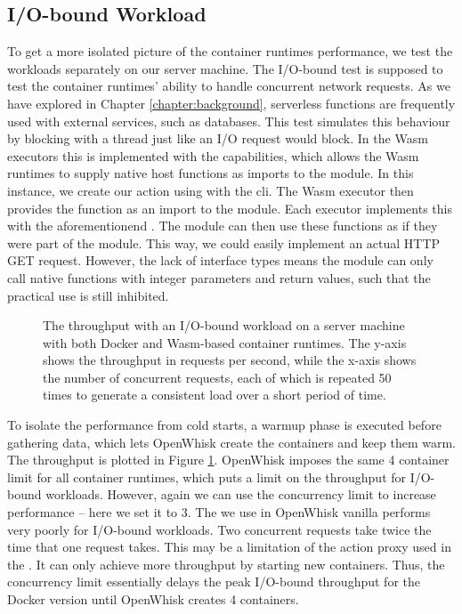 \subsection{I/O-bound Workload}

To get a more isolated picture of the container runtimes performance, we test the workloads separately on our server machine. The I/O-bound test is supposed to test the container runtimes' ability to handle concurrent network requests. As we have explored in Chapter \ref{chapter:background}, serverless functions are frequently used with external services, such as databases. This test simulates this behaviour by blocking with a thread  just like an I/O request would block. In the Wasm executors this is implemented with the capabilities, which allows the Wasm runtimes to supply native host functions as imports to the module. In this instance, we create our action using  with the  cli. The Wasm executor then provides the  function as an import to the module. Each executor implements this with the aforementionend . The module can then use these functions as if they were part of the module. This way, we could easily implement an actual HTTP GET request. However, the lack of interface types means the module can only call native functions with integer parameters and return values, such that the practical use is still inhibited.

\begin{figure}
    \begin{center}
        
    \end{center}
    \caption{The throughput with an I/O-bound workload on a server machine with both Docker and Wasm-based container runtimes. The y-axis shows the throughput in requests per second, while the x-axis shows the number of concurrent requests, each of which is repeated 50 times to generate a consistent load over a short period of time.}
    \label{fig:pc-load-block}
\end{figure}

To isolate the performance from cold starts, a warmup phase is executed before gathering data, which lets OpenWhisk create the containers and keep them warm. The throughput is plotted in Figure \ref{fig:pc-load-block}. OpenWhisk imposes the same 4 container limit for all container runtimes, which puts a limit on the throughput for I/O-bound workloads. However, again we can use the concurrency limit to increase performance -- here we set it to 3. The  we use in OpenWhisk vanilla performs very poorly for I/O-bound workloads. Two concurrent requests take twice the time that one request takes. This may be a limitation of the action proxy used in the .
It can only achieve more throughput by starting new containers. Thus, the concurrency limit essentially delays the peak I/O-bound throughput for the Docker version until OpenWhisk creates 4 containers.

